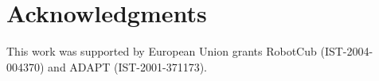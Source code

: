 \section{Acknowledgments}
This work was supported by European Union grants RobotCub (IST-2004-004370)
and ADAPT (IST-2001-371173).
